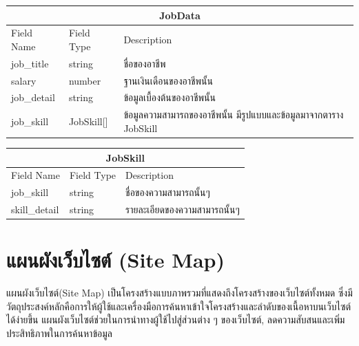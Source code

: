 \begin{table}[H]
  \begin{tabular*}{\textwidth}{l|l|p{}}
  \hline
    \multicolumn{3}{c}{JobData}                                                                      \\\hline
    Field Name  & Field Type     & Description                                                       \\\hline
    job\_title  & string         & ชื่อของอาชีพ                                                      \\
    salary      & number         & ฐานเงินเดือนของอาชีพนั้น                                          \\
    job\_detail & string         & ข้อมูลเบื้องต้นของอาชีพนั้น                                       \\
    job\_skill  & JobSkill{[}{]} & ข้อมูลความสามารถของอาชีพนั้น มีรูปแบบและข้อมูลมาจากตาราง JobSkill \\ \hline
  \end{tabular*}
\end{table}

\begin{table}[H]
  \begin{tabular*}{\textwidth}{l|l|p{}}
  \hline
    \multicolumn{3}{c}{JobSkill}                              \\\hline
    Field Name    & Field Type & Description                  \\\hline
    job\_skill    & string     & ชื่อของความสามารถนั้นๆ       \\
    skill\_detail & string     & รายละเอียดของความสามารถนั้นๆ \\\hline
  \end{tabular*}
\end{table}

\section{แผนผังเว็บไซต์ (Site Map)}
แผนผังเว็บไซต์(Site Map) เป็นโครงสร้างแบบภาพรวมที่แสดงถึงโครงสร้างของเว็บไซต์ทั้งหมด ซึ่งมีวัตถุประสงค์หลักคือการให้ผู้ใช้และเครื่องมือการค้นหาเข้าใจโครงสร้างและลำดับของเนื้อหาบนเว็บไซต์ได้ง่ายขึ้น แผนผังเว็บไซต์ช่วยในการนำทางผู้ใช้ไปสู่ส่วนต่าง ๆ ของเว็บไซต์, ลดความสับสนและเพิ่มประสิทธิภาพในการค้นหาข้อมูล

